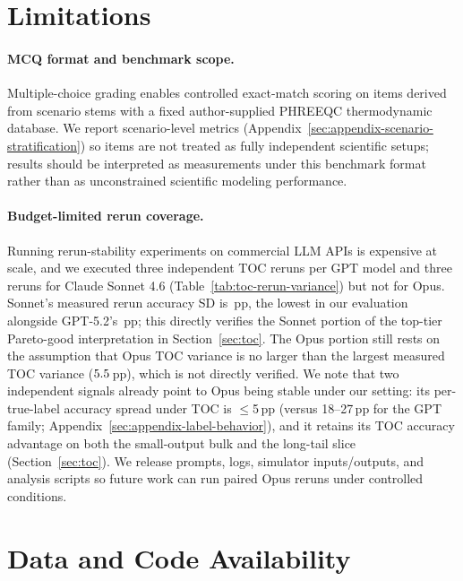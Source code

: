 \documentclass{article}
\begin{document}
\section{Limitations}

\paragraph{MCQ format and benchmark scope.}
Multiple-choice grading enables controlled exact-match scoring on \BenchN{} items derived from \BenchScenarioN{} scenario stems with a fixed author-supplied PHREEQC thermodynamic database. We report scenario-level metrics (Appendix~\ref{sec:appendix-scenario-stratification}) so items are not treated as fully independent scientific setups; results should be interpreted as measurements under this benchmark format rather than as unconstrained scientific modeling performance.

\paragraph{Budget-limited rerun coverage.}
Running rerun-stability experiments on commercial LLM APIs is expensive at scale, and we executed three independent TOC reruns per GPT model and three reruns for Claude Sonnet 4.6 (Table~\ref{tab:toc-rerun-variance}) but not for Opus. Sonnet's measured rerun accuracy SD is \SonnetTOCRerunSD\,pp, the lowest in our evaluation alongside GPT-5.2's \GPTFiveTwoTOCRerunSD\,pp; this directly verifies the Sonnet portion of the top-tier Pareto-good interpretation in Section~\ref{sec:toc}. The Opus portion still rests on the assumption that Opus TOC variance is no larger than the largest measured TOC variance ($5.5$\,pp), which is not directly verified. We note that two independent signals already point to Opus being stable under our setting: its per-true-label accuracy spread under TOC is $\le$5\,pp (versus 18--27\,pp for the GPT family; Appendix~\ref{sec:appendix-label-behavior}), and it retains its TOC accuracy advantage on both the small-output bulk and the long-tail slice (Section~\ref{sec:toc}). We release prompts, logs, simulator inputs/outputs, and analysis scripts so future work can run paired Opus reruns under controlled conditions.


\section{Data and Code Availability}
\label{sec:data-availability}
\end{document}
